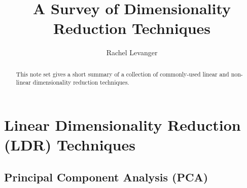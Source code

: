 \documentclass{gtpart}
\title{A Survey of Dimensionality Reduction Techniques}
\author{Rachel Levanger}
\theoremstyle{definition}
\begin{document}
\begin{abstract}    %

This note set gives a short summary of a collection of commonly-used linear and non-linear dimensionality reduction techniques.

\end{abstract}

\maketitle

\tableofcontents


\pagebreak 

\section{Linear Dimensionality Reduction (LDR) Techniques}

\subsection{Principal Component Analysis (PCA)} 
\end{document}
